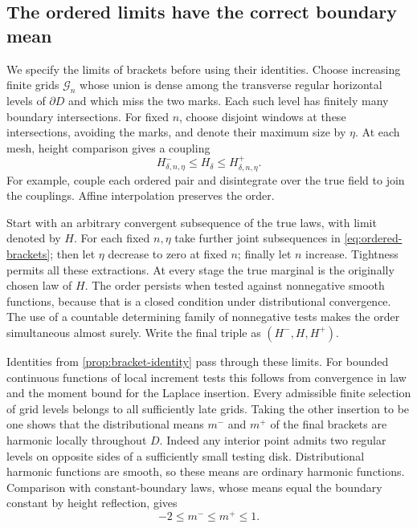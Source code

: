 \subsection{The ordered limits have the correct boundary mean}

We specify the limits of brackets before using their identities.
Choose increasing finite grids $\mathcal G_n$ whose union is dense
among the transverse regular horizontal levels of $\partial D$ and
which miss the two marks. Each such level has finitely many boundary
intersections. For fixed $n$, choose disjoint windows at these
intersections, avoiding the marks, and denote their maximum size by
$\eta$. At each mesh, height comparison gives a coupling
\begin{equation}
                 H_{\delta,n,\eta}^-
                    \le H_\delta\le H_{\delta,n,\eta}^+.
 \label{eq:ordered-brackets}
\end{equation}
For example, couple each ordered pair and disintegrate over the true
field to join the couplings. Affine interpolation preserves the order.

Start with an arbitrary convergent subsequence of the true laws, with
limit denoted by $H$. For each fixed $n,\eta$ take further joint
subsequences in \eqref{eq:ordered-brackets}; then let $\eta$ decrease
to zero at fixed $n$; finally let $n$ increase. Tightness permits all
these extractions. At every stage the true marginal is the originally
chosen law of $H$. The order persists when tested against nonnegative
smooth functions, because that is a closed condition under
distributional convergence. The use of a countable determining family
of nonnegative tests makes the order simultaneous almost surely.
Write the final triple as $(H^-,H,H^+)$.

Identities from \cref{prop:bracket-identity} pass through these limits.
For bounded continuous functions of local increment tests this follows
from convergence in law and the moment bound for the Laplace
insertion. Every admissible finite selection of grid levels belongs
to all sufficiently late grids. Taking the other insertion to be one
shows that the distributional means $m^-$ and $m^+$ of the final
brackets are harmonic locally throughout $D$. Indeed any interior
point admits two regular levels on opposite sides of a sufficiently
small testing disk. Distributional harmonic functions are smooth,
so these means are ordinary harmonic functions. Comparison with
constant-boundary laws, whose means equal the boundary constant by
height reflection, gives
\begin{equation}
                     -2\le m^-\le m^+\le1.
 \label{eq:bounded-bracket-means}
\end{equation}


